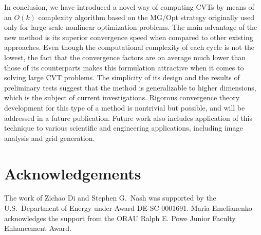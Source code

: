 \documentclass{siamltex}
\begin{document}
In conclusion, we have introduced a novel way of computing CVTs by means of an $O(k)$ complexity algorithm based on the MG/Opt strategy originally used only for large-scale nonlinear optimization problems. %
The main advantage of the new method is its superior convergence speed when compared to other existing approaches. Even though the computational complexity of each cycle is not the lowest, the fact that the convergence factors are on average much lower than those of its counterparts makes this formulation attractive when it comes to solving large CVT problems. The simplicity of its design and the results of preliminary tests suggest that the method is generalizable to higher dimensions, which is the subject of current investigations. Rigorous convergence theory development for this type of a method is nontrivial but possible, and will be addressed in a future publication. Future work also includes application of this technique to various scientific and engineering applications, including image analysis and grid generation.


\section{Acknowledgements}
The work of Zichao Di and Stephen G.~Nash was supported by the U.S.~Department of Energy under %
Award DE-SC-0001691. Maria Emelianenko acknowledges the support from the ORAU Ralph E. Powe Junior %
Faculty Enhancement Award.

%


\end{document}
